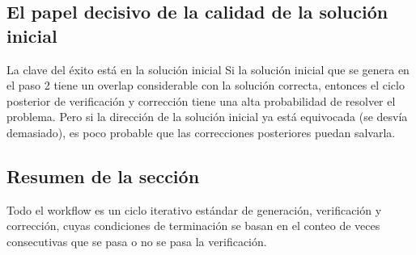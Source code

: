 \subsection{El papel decisivo de la calidad de la solución inicial}

\begin{warningbox}{La clave del éxito está en la solución inicial}
Si la solución inicial que se genera en el paso 2 tiene un overlap considerable con la solución correcta, entonces el ciclo posterior de verificación y corrección tiene una alta probabilidad de resolver el problema. Pero si la dirección de la solución inicial ya está equivocada (se desvía demasiado), es poco probable que las correcciones posteriores puedan salvarla.
\end{warningbox}

\subsection{Resumen de la sección}

Todo el workflow es un ciclo iterativo estándar de generación, verificación y corrección, cuyas condiciones de terminación se basan en el conteo de veces consecutivas que se pasa o no se pasa la verificación.
